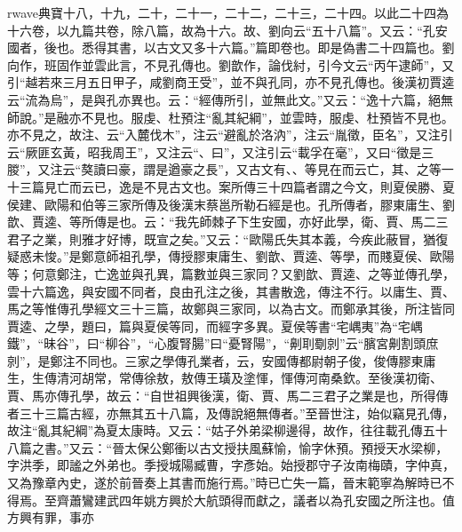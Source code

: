 rwave{典寶}十八，十九，二十，二十一，二十二，二十三，二十四。以此二十四為十六卷，以九篇共卷，除八篇，故為十六。故、劉向云“五十八篇”。又云：“孔安國者，後也。悉得其書，以古文又多十六篇。”篇即卷也。即是偽書二十四篇也。劉向作，班固作並雲此言，不見孔傳也。劉歆作，論伐紂，引今文云“丙午逮師”，又引“越若來三月五日甲子，咸劉商王受”，並不與孔同，亦不見孔傳也。後漢初賈逵云“流為烏”，是與孔亦異也。云：“經傳所引，並無此文。”又云：“逸十六篇，絕無師說。”是融亦不見也。服虔、杜預注“亂其紀綱”，並雲時，服虔、杜預皆不見也。亦不見之，故注、云“入麓伐木”，注云“避亂於洛汭”，注云“胤徵，臣名”，又注引云“厥匪玄黃，昭我周王”，又注云“、曰”，又注引云“載孚在毫”，又曰“徵是三朡”，又注云“獒讀曰豪，謂是遒豪之長”，又古文有、、等見在而云亡，其、之等一十三篇見亡而云已，逸是不見古文也。案所傳三十四篇者謂之今文，則夏侯勝、夏侯建、歐陽和伯等三家所傳及後漢末蔡邕所勒石經是也。孔所傳者，膠東庸生、劉歆、賈逵、等所傳是也。云：“我先師棘子下生安國，亦好此學，衛、賈、馬二三君子之業，則雅才好博，既宣之矣。”又云：“歐陽氏失其本義，今疾此蔽冒，猶復疑惑未悛。”是鄭意師祖孔學，傳授膠東庸生、劉歆、賈逵、等學，而賤夏侯、歐陽等；何意鄭注，亡逸並與孔異，篇數並與三家同？又劉歆、賈逵、之等並傳孔學，雲十六篇逸，與安國不同者，良由孔注之後，其書散逸，傳注不行。以庸生、賈、馬之等惟傳孔學經文三十三篇，故鄭與三家同，以為古文。而鄭承其後，所注皆同賈逵、之學，題曰，篇與夏侯等同，而經字多異。夏侯等書“宅嵎夷”為“宅嵎鐵”，“昧谷”，曰“柳谷”，“心腹腎腸”曰“憂腎陽”，“劓刵劅剠”云“臏宮劓割頭庶剠”，是鄭注不同也。三家之學傳孔業者，云，安國傳都尉朝子俊，俊傳膠東庸生，生傳清河胡常，常傳徐敖，敖傳王璜及塗惲，惲傳河南桑欽。至後漢初衛、賈、馬亦傳孔學，故云：“自世祖興後漢，衛、賈、馬二三君子之業是也，所得傳者三十三篇古經，亦無其五十八篇，及傳說絕無傳者。”至晉世注，始似竊見孔傳，故注“亂其紀綱”為夏太康時。又云：“姑子外弟梁柳邊得，故作，往往載孔傳五十八篇之書。”又云：“晉太保公鄭衝以古文授扶風蘇愉，愉字休預。預授天水梁柳，字洪季，即謐之外弟也。季授城陽臧曹，字彥始。始授郡守子汝南梅賾，字仲真，又為豫章內史，遂於前晉奏上其書而施行焉。”時已亡失一篇，晉末範寧為解時已不得焉。至齊蕭鸞建武四年姚方興於大航頭得而獻之，議者以為孔安國之所注也。值方興有罪，事亦